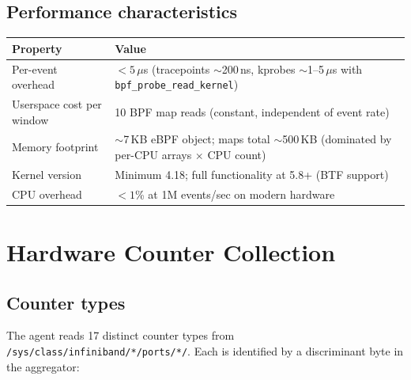 \documentclass[11pt]{article}
\begin{document}
\subsection{Performance characteristics}

\begin{center}
\begin{tabular}{lp{8cm}}
\toprule
Property & Value \\
\midrule
Per-event overhead & $<5\,\mu$s (tracepoints $\sim$200\,ns, kprobes $\sim$1--5\,$\mu$s with \texttt{bpf\_probe\_read\_kernel}) \\
Userspace cost per window & 10 BPF map reads (constant, independent of event rate) \\
Memory footprint & $\sim$7\,KB eBPF object; maps total $\sim$500\,KB (dominated by per-CPU arrays $\times$ CPU count) \\
Kernel version & Minimum 4.18; full functionality at 5.8+ (BTF support) \\
CPU overhead & $<1$\% at 1M events/sec on modern hardware \\
\bottomrule
\end{tabular}
\end{center}


\section{Hardware Counter Collection}
\label{sec:hw-counters}

\subsection{Counter types}

The agent reads 17 distinct counter types from
\texttt{/sys/class/infiniband/*/ports/*/}. Each is identified by a
discriminant byte in the aggregator:
\end{document}
